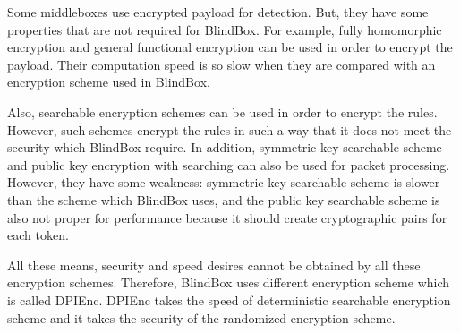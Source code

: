 \documentclass{winslabreport}
\begin{document}
Some middleboxes use encrypted payload for detection. But, they have some properties that are not required for BlindBox. For example,  fully homomorphic encryption\cite{24} and general functional encryption \cite{23} can be used in order to encrypt the payload. Their computation speed is so slow when they are compared with an encryption scheme used in BlindBox.

Also, searchable encryption schemes can be used in order to encrypt the rules. However, such schemes encrypt the rules in such a way that it does not meet the security which BlindBox require. In addition, symmetric key searchable scheme \cite{46} and public key encryption with searching  \cite{19} can also be used for packet processing. However, they have some weakness: symmetric key searchable scheme is slower than the scheme which BlindBox uses, and the public key searchable scheme is also not proper for performance because it should create cryptographic pairs for each token.

All these means, security and speed desires cannot be obtained by all these encryption schemes. Therefore, BlindBox uses different encryption scheme which is called DPIEnc. DPIEnc takes the speed of deterministic searchable encryption scheme and it takes the security of the randomized encryption scheme.   



\end{document}
